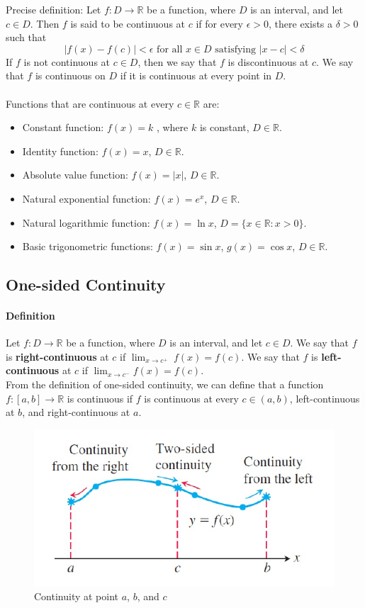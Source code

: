 \documentclass[12pt]{article}
\begin{document}
\noindent
Precise definition: Let $f : D \rightarrow \mathbb{R}$ be a function, where $D$ is an interval, and let
$c \in D$. Then $f$ is said to be continuous at $c$ if for every $\epsilon > 0$,
there exists a $\delta > 0$ such that 
\[
    |f(x) - f(c)| < \epsilon \textrm{ for all } x \in D \textrm{ satisfying } |x - c| < \delta
\]
\noindent
If $f$ is not continuous at $c \in D$, then we say that $f$ is
discontinuous at $c$. We say that $f$ is continuous on $D$ if it is
continuous at every point in $D$. \\ \\
\noindent
Functions that are continuous at every $c \in \mathbb{R}$ are:
\begin{itemize} 
     \item Constant function: $f(x) = k$ , where $k$ is constant, $D \in \mathbb{R}$.
     \item Identity function: $f(x) = x$, $D \in \mathbb{R}$.
     \item Absolute value function: $f(x) = |x|$, $D \in \mathbb{R}$.
     \item Natural exponential function: $f(x) = e^x$, $D \in \mathbb{R}$.
     \item Natural logarithmic function: $f(x) = \ln x$, $D = \{x \in \mathbb{R} : x > 0\}$.
     \item Basic trigonometric functions: $f(x) = \sin x$, $g(x) = \cos{x}$, $D \in \mathbb{R}$.
\end{itemize}
\subsection{One-sided Continuity}
\paragraph{Definition} Let $f : D \rightarrow \mathbb{R}$ be a function, where $D$ is an interval, and let
$c \in D$. We say that $f$ is \textbf{right-continuous} at $c$ if $\lim_{x \to c^+} \; f(x) = f(c)$.
We say that $f$ is \textbf{left-continuous} at $c$ if $\lim_{x \to c^-} f(x) = f(c)$. \\

\noindent
From the definition of one-sided continuity, we can define that 
a function $f : [a,b] \rightarrow \mathbb{R}$ is continuous if $f$ is continuous at
every $c \in (a,b)$, left-continuous at $b$, and right-continuous at $a$.

\begin{figure}[h!]
    \centering
    \includegraphics[width=0.5\linewidth]{images/continuity.png}
    \caption{Continuity at point $a$, $b$, and $c$}
\end{figure} 
\end{document}
